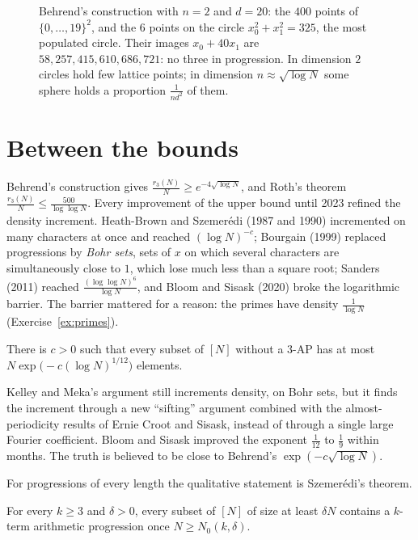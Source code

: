 \begin{figure}[ht]
\centering
{}
\caption{Behrend's construction with $n=2$ and $d=20$: the $400$ points of $\{0,\dots,19\}^2$, and the $6$ points on the circle $x_0^2+x_1^2=325$, the most populated circle. Their images $x_0+40x_1$ are $58,257,415,610,686,721$: no three in progression. In dimension $2$ circles hold few lattice points; in dimension $n\approx\sqrt{\log N}$ some sphere holds a proportion $\frac1{nd^2}$ of them.}
\label{fig:behrend}
\end{figure}

\section{Between the bounds}

Behrend's construction gives $\frac{r_3(N)}N\ge e^{-4\sqrt{\log N}}$, and Roth's theorem $\frac{r_3(N)}N\le\frac{500}{\log\log N}$. Every improvement of the upper bound until 2023 refined the density increment. Heath-Brown and Szemerédi (1987 and 1990) incremented on many characters at once and reached $(\log N)^{-c}$; Bourgain (1999) replaced progressions by \emph{Bohr sets}, sets of $x$ on which several characters are simultaneously close to $1$, which lose much less than a square root; Sanders (2011) reached $\frac{(\log\log N)^6}{\log N}$, and Bloom and Sisask (2020) broke the logarithmic barrier. The barrier mattered for a reason: the primes have density $\frac1{\log N}$ (Exercise~\ref{ex:primes}).

\begin{theorem}\label{thm:km}
There is $c>0$ such that every subset of $[N]$ without a $3$-AP has at most $N\exp\bigl(-c(\log N)^{1/12}\bigr)$ elements.
\end{theorem}

Kelley and Meka's argument still increments density, on Bohr sets, but it finds the increment through a new ``sifting'' argument combined with the almost-periodicity results of Ernie Croot and Sisask, instead of through a single large Fourier coefficient. Bloom and Sisask improved the exponent $\frac1{12}$ to $\frac19$ within months. The truth is believed to be close to Behrend's $\exp(-c\sqrt{\log N})$.

For progressions of every length the qualitative statement is Szemerédi's theorem.

\begin{theorem}\label{thm:szemeredi}
For every $k\ge3$ and $\delta>0$, every subset of $[N]$ of size at least $\delta N$ contains a $k$-term arithmetic progression once $N\ge N_0(k,\delta)$.
\end{theorem}

